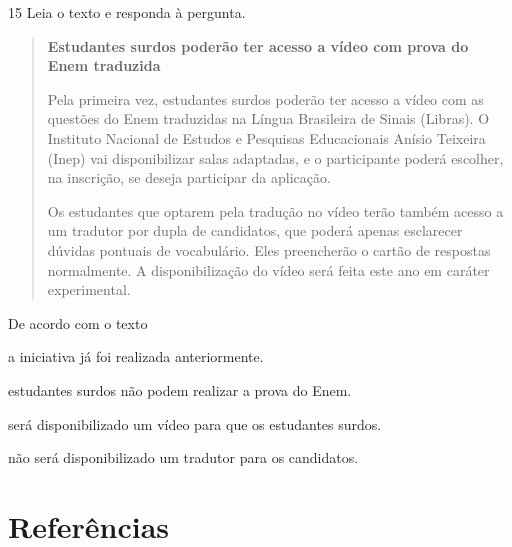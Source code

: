 \num{15} Leia o texto e responda à pergunta.

\begin{quote}
\textbf{Estudantes surdos poderão ter acesso a vídeo com prova do Enem
traduzida}

Pela primeira vez, estudantes surdos poderão ter acesso a vídeo com as
questões do Enem traduzidas na Língua Brasileira de Sinais (Libras). O
Instituto Nacional de Estudos e Pesquisas Educacionais Anísio Teixeira
(Inep) vai disponibilizar salas adaptadas, e o participante poderá
escolher, na inscrição, se deseja participar da aplicação.

Os estudantes que optarem pela tradução no vídeo terão também acesso a
um tradutor por dupla de candidatos, que poderá apenas esclarecer
dúvidas pontuais de vocabulário. Eles preencherão o cartão de respostas
normalmente. A disponibilização do vídeo será feita este ano em caráter
experimental.

\end{quote}

De acordo com o texto

\begin{escolha}
  \item a iniciativa já foi realizada anteriormente.

  \item estudantes surdos não podem realizar a prova do Enem.

  \item será disponibilizado um vídeo para que os estudantes surdos.

  \item não será disponibilizado um tradutor para os candidatos.
\end{escolha}



\chapter{Referências}

